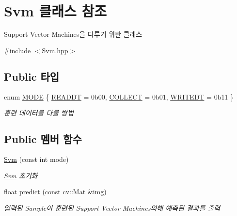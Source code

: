\hypertarget{class_svm}{}\section{Svm 클래스 참조}
\label{class_svm}


Support Vector Machines을 다루기 위한 클래스  




{\ttfamily \#include $<$Svm.\+hpp$>$}

\subsection*{Public 타입}
\begin{DoxyCompactItemize}
\item 
enum \hyperlink{class_svm_a479f12db422de0a4c4d46900ee154928}{M\+O\+DE} \{ \hyperlink{class_svm_a479f12db422de0a4c4d46900ee154928aeb592b07b32a90ab0b49f8912740562a}{R\+E\+A\+D\+DT} = 0b00, 
\hyperlink{class_svm_a479f12db422de0a4c4d46900ee154928a97cff7c5edfa23dfdb9047aa49acb5ad}{C\+O\+L\+L\+E\+CT} = 0b01, 
\hyperlink{class_svm_a479f12db422de0a4c4d46900ee154928acfc63391c47b89218369105e12b992fb}{W\+R\+I\+T\+E\+DT} = 0b11
 \}\begin{DoxyCompactList}\small\item\em 훈련 데이터를 다룰 방법 \end{DoxyCompactList}
\end{DoxyCompactItemize}
\subsection*{Public 멤버 함수}
\begin{DoxyCompactItemize}
\item 
\hyperlink{class_svm_a762af972a037686ea80d9896905f57ed}{Svm} (const int mode)
\begin{DoxyCompactList}\small\item\em \hyperlink{class_svm}{Svm} 초기화 \end{DoxyCompactList}\item 
float \hyperlink{class_svm_ad157df6a49f7380a99232e5b8fa6b63e}{predict} (const cv\+::\+Mat \&img)
\begin{DoxyCompactList}\small\item\em 입력된 Sample이 훈련된 Support Vector Machines의해 예측된 결과를 출력 \end{DoxyCompactList}\end{DoxyCompactItemize}
